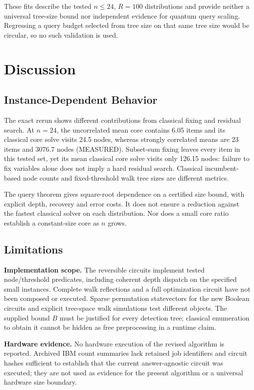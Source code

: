 \documentclass[pdflatex,sn-mathphys-num]{sn-jnl}
\begin{document}
These fits describe the tested $n\le24$, $R=100$ distributions and provide neither a universal tree-size bound nor independent evidence for quantum query scaling. Regressing a query budget selected from tree size on that same tree size would be circular, so no such validation is used.

\section{Discussion}


\subsection{Instance-Dependent Behavior}
The exact rerun shows different contributions from classical fixing and residual search. At $n=24$, the uncorrelated mean core contains 6.05 items and its classical core solve visits 24.5 nodes, whereas strongly correlated means are 23 items and 3076.7 nodes (MEASURED). Subset-sum fixing leaves every item in this tested set, yet its mean classical core solve visits only 126.15 nodes: failure to fix variables alone does not imply a hard residual search. Classical incumbent-based node counts and fixed-threshold walk tree sizes are different metrics.

The query theorem gives square-root dependence on a certified size bound, with explicit depth, recovery and error costs. It does not ensure a reduction against the fastest classical solver on each distribution. Nor does a small core ratio establish a constant-size core as $n$ grows.

\subsection{Limitations}
\textbf{Implementation scope.} The reversible circuits implement tested node/threshold predicates, including coherent depth dispatch on the specified small instances. Complete walk reflections and a full optimization circuit have not been composed or executed. Sparse permutation statevectors for the new Boolean circuits and explicit tree-space walk simulations test different objects. The supplied bound $B$ must be justified for every detection tree; classical enumeration to obtain it cannot be hidden as free preprocessing in a runtime claim.

\textbf{Hardware evidence.} No hardware execution of the revised algorithm is reported. Archived IBM count summaries lack retained job identifiers and circuit hashes sufficient to establish that the current answer-agnostic circuit was executed; they are not used as evidence for the present algorithm or a universal hardware size boundary.
\end{document}
